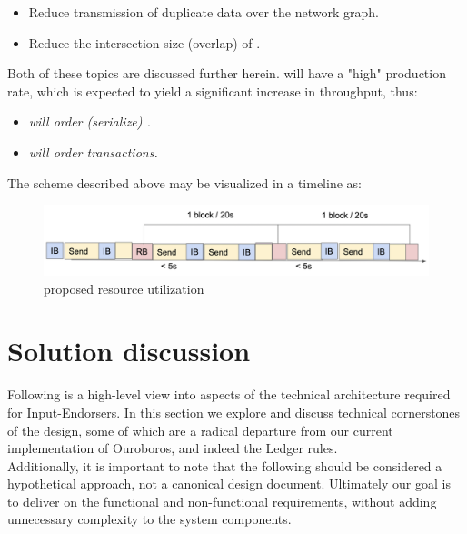 \documentclass[11pt,a4paper]{article}
\begin{document}
\begin{itemize}
  \item Reduce transmission of duplicate data over the network graph.
  \item Reduce the intersection size (overlap) of .
\end{itemize}

Both of these topics are discussed further herein.  will have a "high" production rate, which is expected 
to yield a significant increase in throughput, thus: \\

\begin{itemize}
  \item \emph{ will order (serialize) .} 
  \item \emph{ will order transactions.} \\
\end{itemize}

The scheme described above may be visualized in a timeline as:

\begin{figure}[ht]
  \includegraphics[width=\linewidth]{proposed_usage.png}
  \caption{proposed resource utilization}
  \label{fig:proposed utilization}
\end{figure}

\pagebreak

\section{Solution discussion}
Following is a high-level view into aspects of the technical architecture required for Input-Endorsers.
In this section we explore and discuss technical cornerstones of the design, some of which are a radical
departure from our current implementation of Ouroboros, and indeed the Ledger rules. \\ 

Additionally, it is important to note that the following should be considered a hypothetical approach, 
not a canonical design document. Ultimately our goal is to deliver on the functional and non-functional 
requirements, without adding unnecessary complexity to the system components. \\
\end{document}
